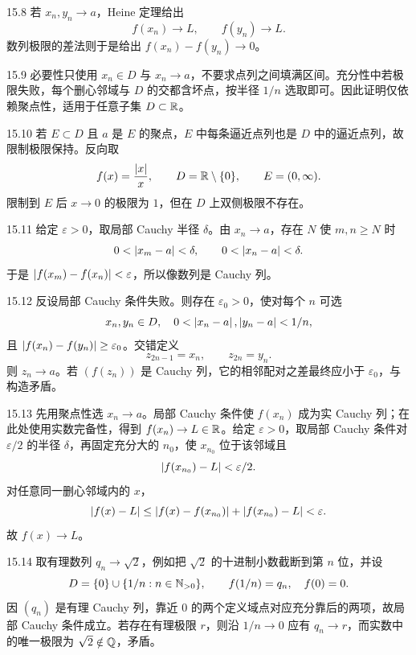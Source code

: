 \begin{solution}{15.8}
若 \(x_n,y_n\to a\)，Heine 定理给出
\[
 f(x_n)\to L,\qquad f(y_n)\to L.
\]
数列极限的差法则于是给出 \(f(x_n)-f(y_n)\to0\)。
\end{solution}

\begin{solution}{15.9}
必要性只使用 \(x_n\in D\) 与 \(x_n\to a\)，不要求点列之间填满区间。充分性中若极限失败，每个删心邻域与 \(D\) 的交都含坏点，按半径 \(1/n\) 选取即可。因此证明仅依赖聚点性，适用于任意子集 \(D\subset\mathbb{R}\)。
\end{solution}

\begin{solution}{15.10}
若 \(E\subset D\) 且 \(a\) 是 \(E\) 的聚点，\(E\) 中每条逼近点列也是 \(D\) 中的逼近点列，故限制极限保持。反向取
\[
 f(x)=\frac{\left|x\right|}{x},\qquad D=\mathbb{R}\setminus\{0\},\qquad E=(0,\infty).
\]
限制到 \(E\) 后 \(x\to0\) 的极限为 \(1\)，但在 \(D\) 上双侧极限不存在。
\end{solution}

\begin{solution}{15.11}
给定 \(\varepsilon>0\)，取局部 Cauchy 半径 \(\delta\)。由 \(x_n\to a\)，存在 \(N\) 使 \(m,n\ge N\) 时
\[
 0<\left|x_m-a\right|<\delta,\qquad0<\left|x_n-a\right|<\delta.
\]
于是 \(\left|f(x_m)-f(x_n)\right|<\varepsilon\)，所以像数列是 Cauchy 列。
\end{solution}

\begin{solution}{15.12}
反设局部 Cauchy 条件失败。则存在 \(\varepsilon_0>0\)，使对每个 \(n\) 可选
\[
 x_n,y_n\in D,\quad
 0<\left|x_n-a\right|,\left|y_n-a\right|<1/n,
\]
且 \(\left|f(x_n)-f(y_n)\right|\ge\varepsilon_0\)。交错定义
\[
 z_{2n-1}=x_n,\qquad z_{2n}=y_n.
\]
则 \(z_n\to a\)。若 \((f(z_n))\) 是 Cauchy 列，它的相邻配对之差最终应小于 \(\varepsilon_0\)，与构造矛盾。
\end{solution}

\begin{solution}{15.13}
先用聚点性选 \(x_n\to a\)。局部 Cauchy 条件使 \(f(x_n)\) 成为实 Cauchy 列；在此处使用实数完备性，得到 \(f(x_n)\to L\in\mathbb{R}\)。给定 \(\varepsilon>0\)，取局部 Cauchy 条件对 \(\varepsilon/2\) 的半径 \(\delta\)，再固定充分大的 \(n_0\)，使 \(x_{n_0}\) 位于该邻域且
\[
 \left|f(x_{n_0})-L\right|<\varepsilon/2.
\]
对任意同一删心邻域内的 \(x\)，
\[
 \left|f(x)-L\right|
 \le\left|f(x)-f(x_{n_0})\right|+\left|f(x_{n_0})-L\right|
 <\varepsilon.
\]
故 \(f(x)\to L\)。
\end{solution}

\begin{solution}{15.14}
取有理数列 \(q_n\to\sqrt2\)，例如把 \(\sqrt2\) 的十进制小数截断到第 \(n\) 位，并设
\[
 D=\{0\}\cup\{1/n:n\in\mathbb{N}_{>0}\},\qquad f(1/n)=q_n,\quad f(0)=0.
\]
因 \((q_n)\) 是有理 Cauchy 列，靠近 \(0\) 的两个定义域点对应充分靠后的两项，故局部 Cauchy 条件成立。若存在有理极限 \(r\)，则沿 \(1/n\to0\) 应有 \(q_n\to r\)，而实数中的唯一极限为 \(\sqrt2\notin\mathbb{Q}\)，矛盾。
\end{solution}

